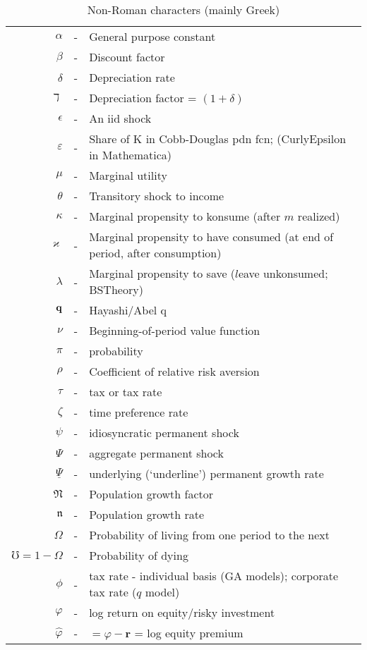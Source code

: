 \documentclass{lecturenotes}
\begin{document}
\begin{table}
\caption{Non-Roman characters (mainly Greek)}
\begin{tabular}{rcl}
    $\alpha$   & - & General purpose constant
\\  $\beta$   & - & Discount factor
\\  $\delta$  & - & Depreciation rate
\\  $\daleth$ & - & Depreciation factor = $(1+\delta)$
\\  $\epsilon$ & - & An iid shock
\\  $\varepsilon$ & - & Share of K in Cobb-Douglas pdn fcn; (CurlyEpsilon in Mathematica)
\\  $\mu$     & - & Marginal utility
\\  $\theta$  & - & Transitory shock to income
\\  $\kappa$  & - & Marginal propensity to konsume (after $m$ realized)
\\  $\varkappa$  & - & Marginal propensity to have consumed (at end of period, after consumption)
\\  $\lambda$ & - & Marginal propensity to save ($l$eave unkonsumed; BSTheory)
\\  $\text{$\mathbf{q}$}$   & - & Hayashi/Abel q
\\  $\nu$     & - & Beginning-of-period value function
\\  $\pi$     & - & probability
\\  $\rho$    & - & Coefficient of relative risk aversion
\\  $\tau$    & - & tax or tax rate
\\  $\zeta$    & - & time preference rate
\\  $\psi$    & - & idiosyncratic permanent shock
\\  $\Psi$    & - & aggregate permanent shock
\\  $\underline{\Psi}$ & - & underlying (`underline') permanent growth rate
\\  $\mathfrak{N}$ & - & Population growth factor
\\  $\mathfrak{n}$ & - & Population growth rate
\\  $\Omega$   & - & Probability of living from one period to the next
\\  $\mho=1-\Omega$  & - & Probability of dying 
\\  $\phi$    & - & tax rate - individual basis (GA models); corporate tax rate ($q$ model)
\\  $\varphi$ & - & log return on equity/risky investment
\\  $\hat{\varphi}$ & - & $= \varphi - \mathbf{r}$ = log equity premium

\end{tabular}
\end{table}
\end{document}
